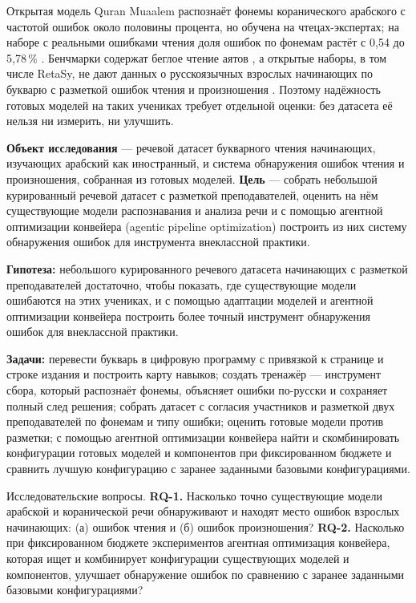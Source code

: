 \documentclass[a4paper,14pt,oneside]{extreport}
\begin{document}
Открытая модель Quran Muaalem распознаёт фонемы коранического арабского с частотой ошибок около половины
процента, но обучена на чтецах-экспертах; на наборе с реальными ошибками чтения доля ошибок по фонемам
растёт с 0,54 до 5,78\,\% \cite{SRC-002}. Бенчмарки содержат беглое чтение аятов \cite{SRC-004}, а
открытые наборы, в том числе RetaSy, не дают данных о русскоязычных взрослых начинающих по букварю с
разметкой ошибок чтения и произношения \cite{SRC-032}. Поэтому надёжность готовых моделей на таких учениках
требует отдельной оценки: без датасета её нельзя ни измерить, ни улучшить.

\textbf{Объект исследования} --- речевой датасет букварного чтения начинающих, изучающих арабский как
иностранный, и система обнаружения ошибок чтения и произношения, собранная из готовых моделей. \textbf{Цель} ---
собрать небольшой курированный речевой датасет с разметкой преподавателей, оценить на нём существующие модели
распознавания и анализа речи и с помощью агентной оптимизации конвейера (agentic pipeline optimization) построить из них систему обнаружения ошибок для инструмента внеклассной практики.

\textbf{Гипотеза:} небольшого курированного речевого датасета начинающих с разметкой преподавателей достаточно, чтобы показать, где существующие модели ошибаются на этих учениках, и с помощью адаптации моделей и агентной оптимизации конвейера построить более точный инструмент обнаружения ошибок для внеклассной практики.

\textbf{Задачи:} перевести букварь в цифровую программу с привязкой к странице и строке издания и построить
карту навыков; создать тренажёр --- инструмент сбора, который распознаёт фонемы, объясняет ошибки по-русски и
сохраняет полный след решения; собрать датасет с согласия участников и разметкой двух преподавателей по фонемам
и типу ошибки; оценить готовые модели против разметки; с помощью агентной оптимизации конвейера найти и скомбинировать конфигурации готовых моделей и компонентов при фиксированном бюджете и сравнить лучшую конфигурацию с заранее заданными базовыми конфигурациями.

Исследовательские вопросы. \textbf{RQ-1.} Насколько точно существующие модели арабской и коранической речи обнаруживают и находят место ошибок взрослых начинающих: (а) ошибок чтения и (б) ошибок произношения? \textbf{RQ-2.} Насколько при фиксированном бюджете экспериментов агентная оптимизация конвейера, которая ищет и комбинирует конфигурации существующих моделей и компонентов, улучшает обнаружение ошибок по сравнению с заранее заданными базовыми конфигурациями?
\end{document}
